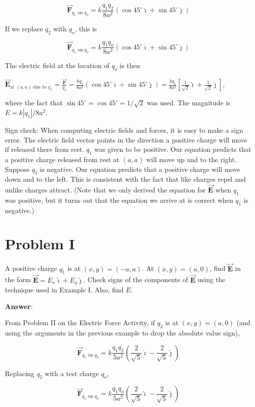 \documentclass{article}
\newcommand{\ds}[0]{\displaystyle}
\newcommand{\ihat}[0]{\hat{\boldsymbol{\imath}}}
\newcommand{\jhat}[0]{\hat{\boldsymbol{\jmath}}}
\newcommand{\bfvec}[1]{\vec{\mathbf{#1}}}
\begin{document}
$$\bfvec{F}_{q_1\text{ on } q_2}=k\frac{q_1q_2}{8a^2}(\cos 45^\circ \ihat + \sin 45^\circ \jhat)$$

If we replace $q_2$ with $q_o$, this is

$$\bfvec{F}_{q_1\text{ on } q_o}=k\frac{q_1q_o}{8a^2}(\cos 45^\circ \ihat + \sin 45^\circ \jhat)$$

The electric field at the location of $q_o$ is then 

$\ds\bfvec{E}_{\text{at }(a,a) \text{ due to }q_1} = \frac{\bfvec{F}}{q_o} = \frac{kq_1}{8a^2}(\cos 45^\circ \ihat + \sin 45^\circ \jhat) =\frac{kq_1}{8a^2}\left[\frac{1}{\sqrt{2}}\ihat + \frac{1}{\sqrt{2}}\jhat\right]$,

where the fact that $\sin 45^\circ=\cos 45^\circ=1/\sqrt{2}$ was used. The magnitude is $E=k|q_1|/8a^2$.

Sign check: When computing electric fields and forces, it is easy to make a sign error. The electric field vector points in the direction a positive charge will move if released there from rest. $q_1$ was given to be positive. Our equation predicts that a positive charge released from rest at $(a, a)$ will move up and to the right. Suppose $q_1$ is negative. Our equation predicts that a positive charge will move down and to the left. This is consistent with the fact that like charges repel and unlike charges attract. (Note that we only derived the equation for $\bfvec{E}$ when $q_1$ was positive, but it turns out that the equation we arrive at is correct when $q_1$ is negative.)

\section{Problem I}

A positive charge $q_1$ is at $(x,y)=(-a,a)$. At $(x,y)=(a, 0)$, find $\bfvec{E}$ in the form $\bfvec{E}=E_x\ihat + E_y\jhat$. Check signs of the components of $\bfvec{E}$ using the technique used in Example I. Also, find $E$.

\ifsolutions
{\bf Answer}:

From Problem II on the Electric Force Activity, if $q_2$ is at $(x,y)=(a, 0)$ (and using the arguments in the previous example to drop the absolute value sign),

$$\bfvec{F}_{q_1\text{ on } q_2}=k\frac{q_1q_2}{5a^2}\left(\frac{2}{\sqrt{5}}\ihat -\frac{2}{\sqrt{5}}\jhat\right)$$

Replacing $q_2$ with a test charge $q_o$,

$$\bfvec{F}_{q_1\text{ on } q_o}=k\frac{q_1q_o}{5a^2}\left(\frac{2}{\sqrt{5}}\ihat -\frac{2}{\sqrt{5}}\jhat\right)$$
\end{document}
